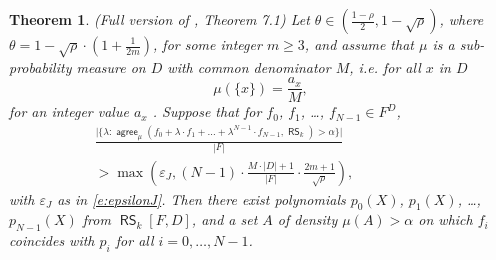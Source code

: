 \documentclass[11pt]{article}
\newtheorem{thm}{Theorem}[]
\theoremstyle{definition}
\theoremstyle{remark}
\DeclareMathOperator{\RS}{\mathsf{RS}}
\DeclareMathOperator{\agree}{\mathsf{agree}}
\begin{document}
\begin{thm}
(Full version of \cite{ProximityGaps}, Theorem 7.1) Let $\theta\in \left(\frac{1-\rho}{2},1-\sqrt\rho\right)$, where $\theta = 1-\sqrt\rho \cdot \left(1+\frac{1}{2m}\right)$, for some integer $m\geq 3$, and assume that $\mu$ is a sub-probability measure on $D$ with common denominator $M$, i.e. for all $x$ in $D$
\[
\mu(\{x\}) = \frac{a_x}{M},
\]
for an integer value $a_x$ . 
Suppose that for $f_0$, $f_1$, \ldots, $f_{N-1}\in F^D$, 
\begin{equation*}
\begin{aligned}
\frac{
	\big|\big\{ \lambda : \agree_\mu(f_0 + \lambda\cdot f_1+ \ldots +\lambda^{N-1}\cdot f_{N-1}, \RS_k)>\alpha \big\}\big|
	}
	{|F|}
\qquad\qquad\qquad
\\
> \max\left(\varepsilon_J, (N-1)\cdot \frac{M\cdot |D|+1}{|F|} \cdot \frac{2m+1}{\sqrt\rho} \right),
\end{aligned}
\end{equation*}
with $\varepsilon_J$ as in \eqref{e:epsilonJ}.
Then there exist polynomials $p_0(X)$, $p_1(X)$, \ldots , $p_{N-1}(X)$ from $\RS_k[F,D]$, and a set $A$ of density $\mu(A)>\alpha$ on which $f_i$ coincides with $p_i$ for all $i=0,\ldots, N-1$. 
\end{thm}
\end{document}

